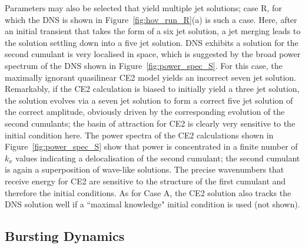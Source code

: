 \documentclass{jfm}
\begin{document}
Parameters may also be selected that yield multiple jet solutions; case R, for which the DNS is shown in Figure~\ref{fig:hov_run_R}(a) is such a case. Here, after an initial transient that takes the form of a six jet solution, a jet merging leads to the solution settling down into a five jet solution. DNS exhibits a solution for the second cumulant is very localised in space, which is suggested by the broad power spectrum of the DNS shown in Figure~\ref{fig:power_spec_S}. For this case, the maximally ignorant quasilinear CE2 model yields an incorrect seven jet solution. Remarkably, if the CE2 calculation is biased to initially yield a three jet solution, the solution evolves via a seven jet solution to form a correct five jet solution of the correct amplitude, obviously driven by the corresponding evolution of the second cumulants; the basin of attraction for CE2 is clearly very sensitive to the initial condition here. The power spectra of the CE2 calculations shown in Figure~\ref{fig:power_spec_S} show that power is concentrated in a finite number of $k_x$ values indicating a delocalisation of the second cumulant; the second cumulant is again a superposition of wave-like solutions. The precise wavenumbers that receive energy for CE2 are sensitive to the structure of the first cumulant and therefore the initial conditions.  As for Case A, the CE2 solution also tracks the DNS solution well if a ``maximal knowledge" initial condition is used (not shown).



\subsection{Bursting Dynamics}
\end{document}
